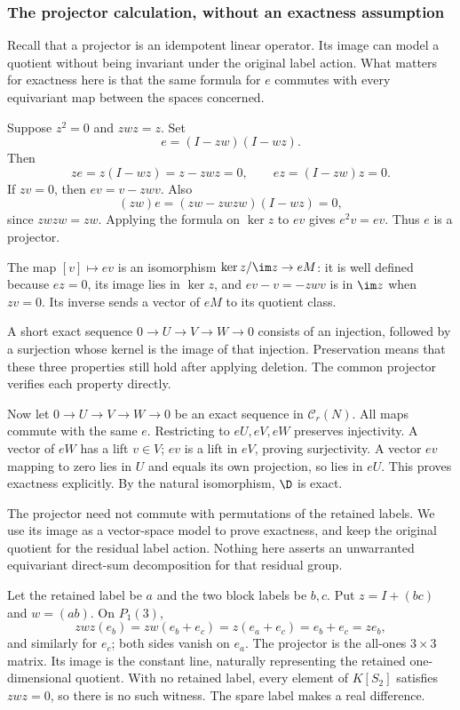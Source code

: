 \subsubsection{The projector calculation, without an exactness assumption}
Recall that a projector is an idempotent linear operator. Its image
can model a quotient without being invariant under the original label
action. What matters for exactness here is that the same formula for
$e$ commutes with every equivariant map between the spaces concerned.

Suppose $z^2=0$ and $zwz=z$. Set
\[e=(I-zw)(I-wz).\]
Then
\[ze=z(I-wz)=z-zwz=0,\qquad ez=(I-zw)z=0.\]
If $zv=0$, then $ev=v-zwv$. Also
\[(zw)e=(zw-zwzw)(I-wz)=0,\]
since $zwzw=zw$. Applying the formula on $\ker z$ to $ev$ gives $e^2v=ev$. Thus $e$ is a projector.

The map $[v]\mapsto ev$ is an isomorphism $\ker z/\im z\to eM$: it is well defined because $ez=0$, its image lies in $\ker z$, and $ev-v=-zwv$ is in $\im z$ when $zv=0$. Its inverse sends a vector of $eM$ to its quotient class.

A short exact sequence $0\to U\to V\to W\to0$ consists of an
injection, followed by a surjection whose kernel is the image of that
injection. Preservation means that these three properties still hold
after applying deletion. The common projector verifies each property
directly.

Now let $0\to U\to V\to W\to0$ be an exact sequence in $\mathcal C_r(N)$. All maps commute with the same $e$. Restricting to $eU,eV,eW$ preserves injectivity. A vector of $eW$ has a lift $v\in V$; $ev$ is a lift in $eV$, proving surjectivity. A vector $ev$ mapping to zero lies in $U$ and equals its own projection, so lies in $eU$. This proves exactness explicitly. By the natural isomorphism, $\D$ is exact.

The projector need not commute with permutations of the retained labels. We use its image as a vector-space model to prove exactness, and keep the original quotient for the residual label action. Nothing here asserts an unwarranted equivariant direct-sum decomposition for that residual group.

\begin{example}
Let the retained label be $a$ and the two block labels be $b,c$. Put $z=I+(bc)$ and $w=(ab)$. On $P_1(3)$,
\[zwz(e_b)=zw(e_b+e_c)=z(e_a+e_c)=e_b+e_c=ze_b,\]
and similarly for $e_c$; both sides vanish on $e_a$. The projector is the all-ones $3\times3$ matrix. Its image is the constant line, naturally representing the retained one-dimensional quotient. With no retained label, every element of $K[S_2]$ satisfies $zwz=0$, so there is no such witness. The spare label makes a real difference.
\end{example}
